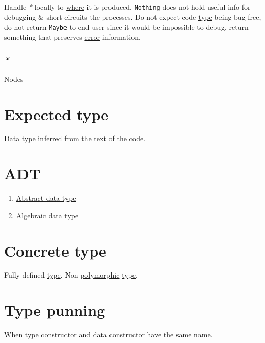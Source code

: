 \documentclass[a4paper,14pt,oneside]{book}
\begin{document}
Handle \emph{*} locally to \hyperref[org95b6103]{where} it is produced. \texttt{Nothing} does not hold useful info for debugging \& short-circuits the processes. Do not expect code \hyperref[org258d25a]{type} being bug-free, do not return \texttt{Maybe} to end user since it would be impossible to debug, return something that preserves \hyperref[orgdcf9b0c]{error} information.\\

\subsubsection{\emph{*}}
\label{sec:orgb284b1d}

\label{org41cd7cf}Nodes\\

\section{\label{org2bd6e86}Expected type}
\label{sec:orga1ed8f0}
\hyperref[orga639c70]{Data type} \hyperref[orgbcdc074]{inferred} from the text of the code.\\

\section{\label{orgbda1cca}ADT}
\label{sec:org23ade1b}
\begin{enumerate}
\item \hyperref[orgc0c7ea3]{Abstract data type}\\
\item \hyperref[orgc88dad0]{Algebraic data type}\\
\end{enumerate}

\section{\label{org31d0281}Concrete type}
\label{sec:org51f9902}
Fully defined \hyperref[org258d25a]{type}. Non-\hyperref[org0bb8292]{polymorphic} \hyperref[org258d25a]{type}.\\

\section{\label{org7cfc486}Type punning}
\label{sec:org5c3b4f7}
When \hyperref[orgea55e61]{type constructor} and \hyperref[org8b087dd]{data constructor} have the same name.\\
\end{document}
